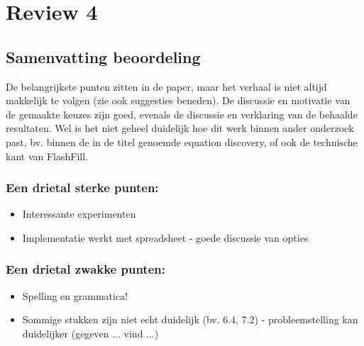 \documentclass{article}
\begin{document}
\section{Review 4}
\subsection*{Samenvatting beoordeling}

De belangrijkste punten zitten in de paper, maar het verhaal is niet altijd makkelijk te volgen (zie ook suggesties beneden). De discussie en motivatie van de gemaakte keuzes zijn goed, evenals de discussie en verklaring van de behaalde resultaten. Wel is het niet geheel duidelijk hoe dit werk binnen ander onderzoek past, bv. binnen de in de titel genoemde equation discovery, of ook de technische kant van FlashFill.

\subsubsection{Een drietal sterke punten:}
\begin{itemize}
\item Interessante experimenten
\item Implementatie werkt met spreadsheet - goede discussie van opties
\end{itemize}

\subsubsection{Een drietal zwakke punten:}
\begin{itemize}
\item Spelling en grammatica!
\item Sommige stukken zijn niet echt duidelijk (bv. 6.4, 7.2) - probleemstelling kan duidelijker (gegeven ... vind ...)
\end{itemize}
\end{document}
